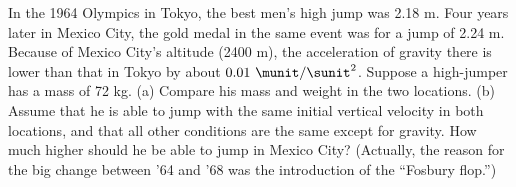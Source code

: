 In the 1964 Olympics in Tokyo, the best men's high jump
was 2.18 m. Four years later in Mexico City, the gold
medal in the same event was for a jump of 2.24 m. Because
of Mexico City's altitude (2400 m), the acceleration of
gravity there is lower than that in Tokyo by about
$0.01\ \munit/\sunit^2$. Suppose a high-jumper has a mass of 72 kg.\hwendpart
(a) Compare his mass and weight in the two locations.\hwendpart
(b) Assume that he is able to jump with the same initial
vertical velocity in both locations, and that all other
conditions are the same except for gravity. How much higher
should he be able to jump in Mexico City?\answercheck\hwendpart
(Actually, the reason for the big change between '64 and '68
was the introduction of the ``Fosbury flop.'')
